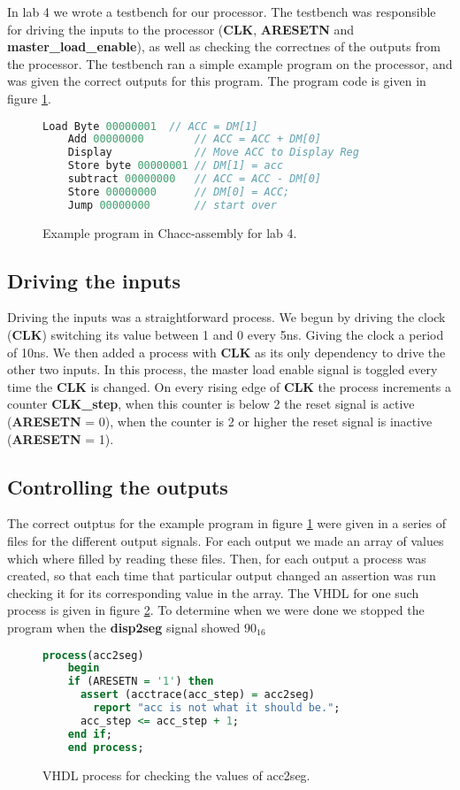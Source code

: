 In lab 4 we wrote a testbench for our processor. The testbench was responsible
for driving the inputs to the processor (\textbf{CLK}, \textbf{ARESETN} and
\textbf{master\_load\_enable}), as well as checking the correctnes of the
outputs from the processor. The testbench ran a simple example program on the
processor, and was given the correct outputs for this program. The program code
is given in figure \ref{code:lab4}. 

\begin{figure}
    \caption{Example program in Chacc-assembly for lab 4.}
    \label{code:lab4}
    \centering
    \begin{lstlisting}[language=c]
    Load Byte 00000001  // ACC = DM[1]
    Add 00000000        // ACC = ACC + DM[0]
    Display             // Move ACC to Display Reg
    Store byte 00000001 // DM[1] = acc
    subtract 00000000   // ACC = ACC - DM[0]
    Store 00000000      // DM[0] = ACC;
    Jump 00000000       // start over
    \end{lstlisting}
\end{figure}

\subsection*{Driving the inputs}
Driving the inputs was a
straightforward process. We begun by driving the clock (\textbf{CLK})
switching its value between 1 and 0 every 5ns. Giving the clock a period of
10ns. We then added a process with \textbf{CLK} as its only dependency to drive
the other two inputs. In this process, the master load enable signal is toggled
every time the \textbf{CLK} is changed. On every rising edge of \textbf{CLK} the
process increments a counter \textbf{CLK\_step}, when this counter is below 2
the reset signal is active (\textbf{ARESETN} = 0), when the counter is 2 or
higher the reset signal is inactive (\textbf{ARESETN} = 1).
\subsection*{Controlling the outputs}
The correct outptus for the example program in figure \ref{code:lab4} were given
in a series of files for the different output signals. For each output we made
an array of values which where filled by reading these files. Then, for each
output a process was created, so that each time that particular output changed
an assertion was run checking it for its corresponding value in the array. The
VHDL for one such process is given in figure \ref{code:lab4Process}. To
determine when we were done we stopped the program when the \textbf{disp2seg}
signal showed $90_{16}$
\begin{figure}
    \caption{VHDL process for checking the values of acc2seg. }
    \label{code:lab4Process}
    \centering
    \begin{lstlisting}[language=vhdl]
    process(acc2seg)
    begin
    if (ARESETN = '1') then
      assert (acctrace(acc_step) = acc2seg)
        report "acc is not what it should be.";
      acc_step <= acc_step + 1;
    end if;
    end process;
    \end{lstlisting}
\end{figure}